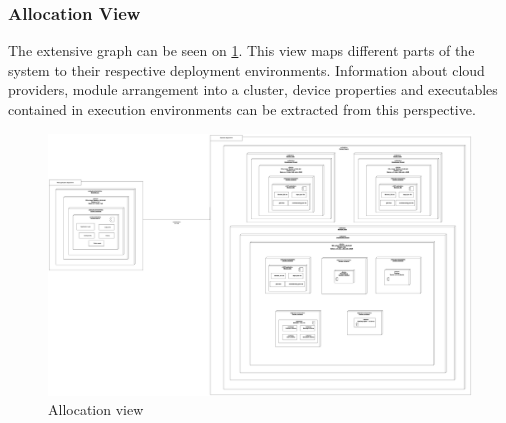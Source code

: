 \subsubsection*{Allocation View}

The extensive graph can be seen on \ref{fig:allocationview}. This view maps different parts of the system to their respective deployment environments. Information about cloud providers, module arrangement into a cluster, device properties and executables contained in execution environments can be extracted from this perspective.

\begin{figure}
    \centering
    \includegraphics[scale=0.18]{images/architectural_views/minitwit_allocation_view.png}
    \caption{Allocation view ~\cite{allocationView}}
    \label{fig:allocationview}
\end{figure}

